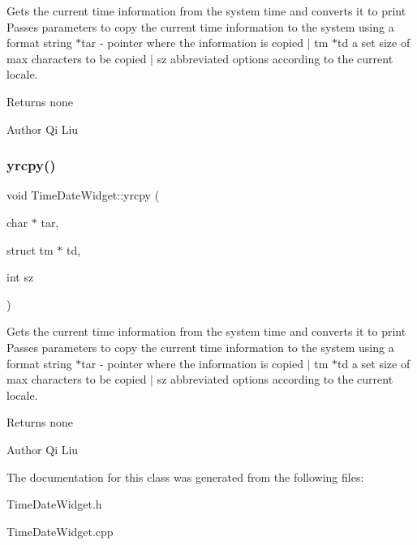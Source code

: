 Gets the current time information from the system time and converts it to print  Passes parameters to copy the current time information to the system using a format string  $\ast$tar -\/ pointer where the information is copied $\vert$ tm $\ast$td a set size of max characters to be copied $\vert$ sz abbreviated options according to the current locale. 

\begin{DoxyReturn}{Returns}
none 
\end{DoxyReturn}
\begin{DoxyAuthor}{Author}
Qi Liu 
\end{DoxyAuthor}
\mbox{\label{class_time_date_widget_aa7cfe9f3a2a54c339e1504a31f8eecc6}} 
\subsubsection{\texorpdfstring{yrcpy()}{yrcpy()}}
{\footnotesize\ttfamily void Time\+Date\+Widget\+::yrcpy (\begin{DoxyParamCaption}\item[{char $\ast$}]{tar,  }\item[{struct tm $\ast$}]{td,  }\item[{int}]{sz }\end{DoxyParamCaption})}



Gets the current time information from the system time and converts it to print  Passes parameters to copy the current time information to the system using a format string  $\ast$tar -\/ pointer where the information is copied $\vert$ tm $\ast$td a set size of max characters to be copied $\vert$ sz abbreviated options according to the current locale. 

\begin{DoxyReturn}{Returns}
none 
\end{DoxyReturn}
\begin{DoxyAuthor}{Author}
Qi Liu 
\end{DoxyAuthor}


The documentation for this class was generated from the following files\+:\begin{DoxyCompactItemize}
\item 
Time\+Date\+Widget.\+h\item 
Time\+Date\+Widget.\+cpp\end{DoxyCompactItemize}

